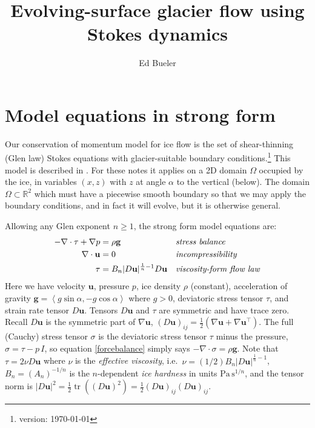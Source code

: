 \documentclass[letterpaper,final,12pt,reqno]{amsart}
\newcommand{\RR}{\mathbb{R}}
\newcommand{\grad}{\nabla}
\newcommand{\Div}{\nabla\cdot}
\newcommand{\trace}{\operatorname{tr}}
\newcommand{\bg}{\mathbf{g}}
\newcommand{\bu}{\mathbf{u}}
\begin{document}
\title{Evolving-surface glacier flow using Stokes dynamics}

\author{Ed Bueler}

\maketitle

\thispagestyle{empty}
\bigskip

\section{Model equations in strong form} \label{sec:strongform}

Our conservation of momentum model for ice flow is the set of shear-thinning (Glen law) Stokes equations with glacier-suitable boundary conditions.\footnote{version: \today}  This model is described in \cite{GreveBlatter2009,JouvetRappaz2011}.  For these notes it applies on a 2D domain $\Omega$ occupied by the ice, in variables $(x,z)$ with $z$ at angle $\alpha$ to the vertical (below).  The domain $\Omega \subset \RR^2$ which must have a piecewise smooth boundary so that we may apply the boundary conditions, and in fact it will evolve, but it is otherwise general.

Allowing any Glen exponent $n\ge 1$, the strong form model equations are:
\begin{align}
- \nabla \cdot \tau + \nabla p &= \rho \bg &&\text{\emph{stress balance}} \label{forcebalance} \\
\nabla \cdot \bu &= 0 &&\text{\emph{incompressibility}} \label{incompressible} \\
\tau &= B_n |D\bu|^{\frac{1}{n} - 1} D\bu  &&\text{\emph{viscosity-form flow law}} \label{viscflowlaw}
\end{align}
Here we have velocity $\bu$, pressure $p$, ice density $\rho$ (constant), acceleration of gravity $\bg = \left<g\sin\alpha,-g\cos\alpha\right>$ where $g>0$, deviatoric stress tensor $\tau$, and strain rate tensor $D\bu$.  Tensors $D\bu$ and $\tau$ are symmetric and have trace zero.  Recall $D\bu$ is the symmetric part of $\grad \bu$, $(D\bu)_{ij} = \frac{1}{2} \left(\grad\bu + \grad\bu^\top\right)$.  The full (Cauchy) stress tensor $\sigma$ is the deviatoric stress tensor $\tau$ minus the pressure, $\sigma = \tau - p\,I$, so equation \eqref{forcebalance} simply says $-\Div \sigma = \rho \bg$.  Note that $\tau = 2\nu D\bu$ where $\nu$ is the \emph{effective viscosity}, i.e.~$\nu=(1/2)B_n |D\bu|^{\frac{1}{n} - 1}$, $B_n = (A_n)^{-1/n}$ is the $n$-dependent \emph{ice hardness} in units $\text{Pa}\,\text{s}^{1/n}$, and the tensor norm is $|D\bu|^2 = \frac{1}{2} \trace\left((D\bu)^2\right) = \frac{1}{2} (D\bu)_{ij} (D\bu)_{ij}$.
\end{document}
